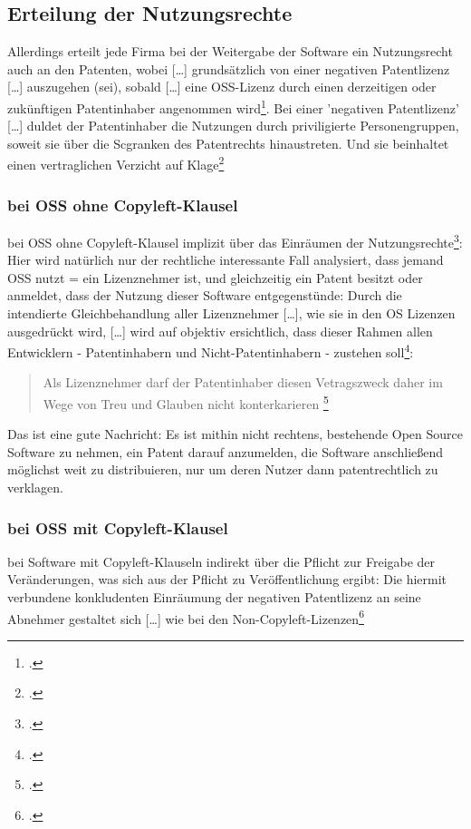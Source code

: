 \documentclass[DIV=calc,BCOR=5mm,11pt,headings=small,oneside,abstract=true, toc=bib]{scrartcl}
\begin{document}
\subsection{Erteilung der Nutzungsrechte}
Allerdings erteilt jede Firma bei der Weitergabe der Software ein Nutzungsrecht
auch an den Patenten, wobei \glqq{}[\ldots] grundsätzlich von einer
negativen Patentlizenz [\ldots] auszugehen (sei)\grqq{}, sobald \glqq{}[\ldots]
eine OSS-Lizenz durch einen derzeitigen oder zukünftigen Patentinhaber
angenommen wird\grqq{}\grqq{}\footcite[vgl.][79]{Suchomski2011a}. Bei einer
'negativen Patentlizenz' \glqq{}[\ldots] duldet der Patentinhaber die
Nutzungen durch priviligierte Personengruppen, soweit sie über die
Scgranken des Patentrechts hinaustreten\grqq{}. Und sie beinhaltet
\glqq{}einen vertraglichen Verzicht auf
Klage\grqq{}\footcite[vgl.][69]{Suchomski2011a}

\subsubsection{bei OSS ohne Copyleft-Klausel}
bei OSS ohne Copyleft-Klausel implizit über das Einräumen der
Nutzungsrechte\footcite[vgl.][117]{Suchomski2011a}: Hier wird  natürlich
nur der rechtliche interessante Fall analysiert, dass jemand OSS nutzt =
ein Lizenznehmer ist, und gleichzeitig ein Patent besitzt oder anmeldet, dass
der Nutzung dieser Software entgegenstünde: \glqq{}Durch die intendierte
Gleichbehandlung aller Lizenznehmer [\ldots]\grqq{}, wie sie in den OS Lizenzen
ausgedrückt wird, \glqq{}[\ldots] wird auf objektiv ersichtlich, dass
dieser Rahmen allen Entwicklern - Patentinhabern und Nicht-Patentinhabern
- zustehen soll\grqq{}\footcite[vgl.][118]{Suchomski2011a}: 

\begin{quote}
\glqq{}Als Lizenznehmer darf der Patentinhaber diesen Vetragszweck daher im Wege
von Treu und Glauben nicht konterkarieren
\grqq{}\grqq{}\footcite[][118]{Suchomski2011a}
\end{quote}

Das ist eine gute Nachricht: Es ist mithin nicht rechtens, bestehende Open
Source Software zu nehmen, ein Patent darauf anzumelden, die Software
anschließend möglichst weit zu distribuieren, nur um deren Nutzer dann
patentrechtlich zu verklagen.

\subsubsection{bei OSS mit Copyleft-Klausel}
bei Software mit Copyleft-Klauseln indirekt über die Pflicht zur Freigabe der
Veränderungen, was sich aus der Pflicht zu Veröffentlichung ergibt:
\glqq{}Die hiermit verbundene konkludenten Einräumung der negativen
Patentlizenz an seine Abnehmer gestaltet sich [\ldots] wie bei den
Non-Copyleft-Lizenzen\grqq{}\footcite[vgl.][118]{Suchomski2011a}
\end{document}

